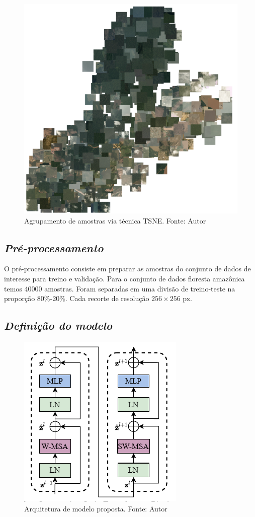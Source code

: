 \begin{figure}[!ht]
    \centering
    \includegraphics[width=0.9\columnwidth]{Imagens/results/EDA/TSNE.png}
    \caption{Agrupamento de amostras via técnica TSNE.
    Fonte: Autor}
   \label{fig:TSNE}
\end{figure}

\subsection{\textit{Pré-processamento}}\label{sec:Cap3_PreProcess}
O pré-processamento consiste em preparar as amostras do conjunto de dados de interesse para treino e validação. Para o conjunto de dados floresta amazônica temos 40000 amostras. Foram separadas em uma divisão de treino-teste na proporção 80\%-20\%. Cada recorte de resolução $256 \times 256$ px.


\subsection{\textit{Definição do modelo}}\label{sec:Cap3_Def_modelo}


\begin{figure}[!ht]
    \centering
    \includegraphics[width=0.5\columnwidth]{Imagens/dois blocos swin sucessivos.png}
    \caption{ Arquitetura de modelo proposta.
    Fonte: Autor}
   \label{fig:Swin-Rsp}
\end{figure}

